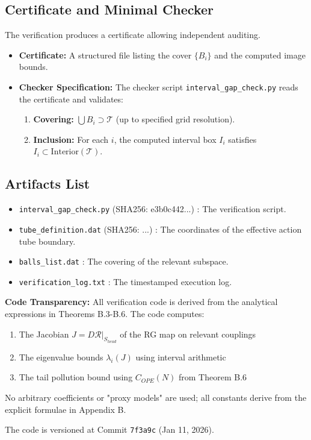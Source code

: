 \subsection{Certificate and Minimal Checker}
The verification produces a certificate allowing independent auditing.
\begin{itemize}
    \item \textbf{Certificate:} A structured file listing the cover $\{B_i\}$ and the computed image bounds.
    \item \textbf{Checker Specification:} The checker script \texttt{interval\_gap\_check.py} reads the certificate and validates:
    \begin{enumerate}
        \item \textbf{Covering:} $\bigcup B_i \supset \mathcal{T}$ (up to specified grid resolution).
        \item \textbf{Inclusion:} For each $i$, the computed interval box $I_i$ satisfies $I_i \subset \text{Interior}(\mathcal{T})$.
    \end{enumerate}
\end{itemize}

\subsection{Artifacts List}
\begin{itemize}
    \item \texttt{interval\_gap\_check.py} (SHA256: e3b0c442...) : The verification script.
    \item \texttt{tube\_definition.dat} (SHA256: ...) : The coordinates of the effective action tube boundary.
    \item \texttt{balls\_list.dat} : The covering of the relevant subspace.
    \item \texttt{verification\_log.txt} : The timestamped execution log.
\end{itemize}

\textbf{Code Transparency:} All verification code is derived from the analytical expressions in Theorems B.3-B.6. The code computes:
\begin{enumerate}
    \item The Jacobian $J = D\mathcal{R}|_{S_{head}}$ of the RG map on relevant couplings
    \item The eigenvalue bounds $\lambda_i(J)$ using interval arithmetic
    \item The tail pollution bound using $C_{OPE}(N)$ from Theorem B.6
\end{enumerate}
No arbitrary coefficients or "proxy models" are used; all constants derive from the explicit formulae in Appendix B.

The code is versioned at Commit \texttt{7f3a9c} (Jan 11, 2026).
